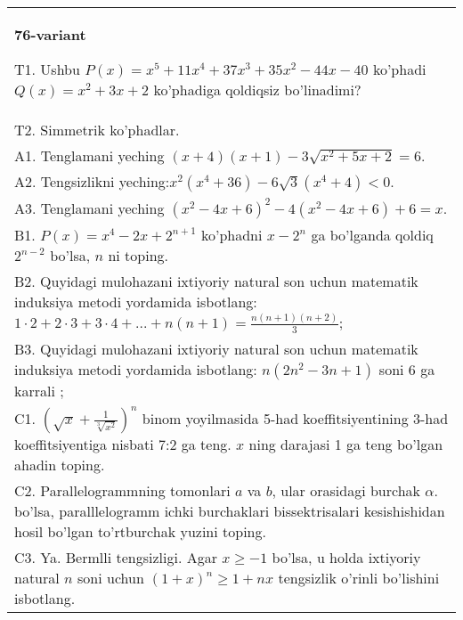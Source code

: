 \documentclass{article}
\begin{document}
\begin{tabular}{m{17cm}}
\textbf{76-variant}
\newline

T1. Ushbu \(P(x) = x^{5} + 11x^{4} + 37x^{3} + 35x^{2} - 44x - 40\) ko'phadi \(Q(x) = x^{2} + 3x + 2\) ko'phadiga qoldiqsiz bo'linadimi? \\
T2. Simmetrik ko'phadlar. \\
A1. Tenglamani yeching \((x + 4)(x + 1) - 3\sqrt{x^{2} + 5x + 2} = 6\). \\
A2. Tengsizlikni yeching:\(x^{2}\left( x^{4} + 36 \right) - 6\sqrt{3}\left( x^{4} + 4 \right) < 0\). \\
A3. Tenglamani yeching \(\left( x^{2} - 4x + 6 \right)^{2} - 4\left( x^{2} - 4x + 6 \right) + 6 = x\). \\
B1. \(P(x) = x^{4} - 2x + 2^{n + 1}\) ko'phadni \(x - 2^{n}\) ga bo'lganda qoldiq \(2^{n - 2}\) bo'lsa, \(n\) ni toping. \\
B2. Quyidagi mulohazani ixtiyoriy natural son uchun matematik induksiya metodi yordamida isbotlang: \(1 \cdot 2 + 2 \cdot 3 + 3 \cdot 4 + ... + n(n + 1) = \frac{n(n + 1)(n + 2)}{3}\); \\
B3. Quyidagi mulohazani ixtiyoriy natural son uchun matematik induksiya metodi yordamida isbotlang: \(n\left( 2n^{2} - 3n + 1 \right)\) soni 6 ga karrali ; \\
C1. \(\left( \sqrt{x} + \frac{1}{\sqrt[3]{x^{2}}} \right)^{n}\) binom yoyilmasida 5-had koeffitsiyentining 3-had koeffitsiyentiga nisbati 7:2 ga teng. \(x\) ning darajasi 1 ga teng bo'lgan ahadin toping. \\
C2. Parallelogrammning tomonlari \(a\) va \(b\), ular orasidagi burchak \(\alpha\). bo'lsa, paralllelogramm ichki burchaklari bissektrisalari kesishishidan hosil bo'lgan to'rtburchak yuzini toping. \\
C3. Ya. Bermlli tengsizligi. Agar \(x \geq - 1\) bo'lsa, u holda ixtiyoriy natural \(n\) soni uchun \((1 + x)^{n} \geq 1 + nx\) tengsizlik o'rinli bo'lishini isbotlang. \\

\end{tabular}
\vspace{1cm}
\end{document}
